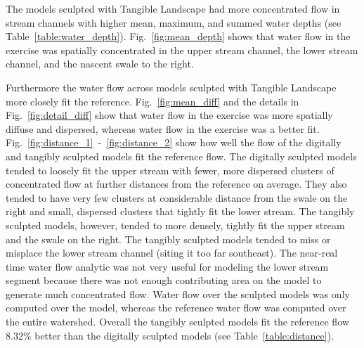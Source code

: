 \documentclass{isprs}
\begin{document}

The models sculpted with Tangible Landscape 
had more concentrated flow in stream channels
with higher 
mean, maximum, and 
summed water depths
(see Table~\ref{table:water_depth}).
%
Fig.~\ref{fig:mean_depth}
shows that water flow in the  exercise was
spatially concentrated 
in the upper stream channel, 
the lower stream channel, 
and the nascent swale to the right.

Furthermore the water flow across models sculpted with Tangible Landscape more closely fit the reference.
Fig.~\ref{fig:mean_diff} and the details in Fig.~\ref{fig:detail_diff} 
show that water flow in the  exercise was more spatially diffuse and dispersed, 
whereas water flow in the  exercise was a better fit. %
%
Fig.~\ref{fig:distance_1}~-~\ref{fig:distance_2} 
show how well the flow of the digitally and tangibly sculpted models fit the reference flow. 
%
The digitally sculpted models tended to loosely fit the upper stream with fewer, more dispersed clusters of concentrated flow at further distances from the reference on average. They also tended to have very few clusters at considerable distance from the swale on the right and small, dispersed clusters that tightly fit the lower stream. 
%
The tangibly sculpted models, however, tended to more densely, tightly fit the upper stream and the swale on the right. 
The tangibly sculpted models tended to miss or misplace the lower stream channel (siting it too far southeast). 
The near-real time water flow analytic was not very useful for modeling the lower stream segment because there was not enough contributing area on the model to generate much concentrated flow. 
Water flow over the sculpted models was only computed over the model, 
whereas the reference water flow was computed over the entire watershed. 
%
Overall the tangibly sculpted models fit the reference flow 8.32\% better than the digitally sculpted models (see Table~\ref{table:distance}).
\end{document}
